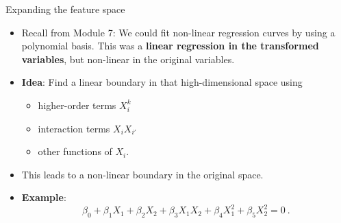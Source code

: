 \documentclass[10pt,ignorenonframetext,]{beamer}
\providecommand{\tightlist}{%
  \setlength{\itemsep}{0pt}\setlength{\parskip}{0pt}}
\begin{document}
\begin{frame}

\begin{block}{Expanding the feature space}

\vspace{2mm}

\begin{itemize}
\tightlist
\item
  Recall from Module 7: We could fit non-linear regression curves by
  using a polynomial basis. This was a \textbf{linear regression in the
  transformed variables}, but non-linear in the original variables.
\end{itemize}

\vspace{2mm}

\begin{itemize}
\tightlist
\item
  \textbf{Idea}: Find a linear boundary in that high-dimensional space
  using

  \begin{itemize}
  \tightlist
  \item
    higher-order terms \(X_i^k\)
  \item
    interaction terms \(X_i X_{i'}\)
  \item
    other functions of \(X_i\).
  \end{itemize}
\end{itemize}

\vspace{2mm}

\begin{itemize}
\tightlist
\item
  This leads to a non-linear boundary in the original space.
\end{itemize}

\vspace{2mm}

\begin{itemize}
\tightlist
\item
  \textbf{Example}:
  \[\beta_0 + \beta_1 X_1 + \beta_2 X_2 + \beta_3 X_1X_2 + \beta_4 X_1^2 + \beta_5 X_2^2 =0 \ .\]
\end{itemize}

\end{block}

\end{frame}
\end{document}
